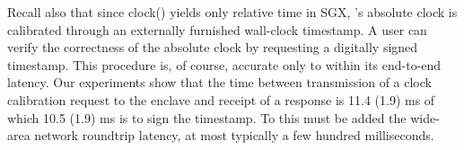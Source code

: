 Recall also that since clock() yields only relative time in SGX, \tc's absolute clock is calibrated through an externally furnished wall-clock timestamp.
A user can verify the correctness of the \encname absolute clock by requesting a digitally signed timestamp.
This procedure is, of course, accurate only to within its end-to-end latency. Our experiments show that the time between \medname transmission of a clock calibration request to the enclave and receipt of a response is
11.4 (1.9) ms of which 10.5 (1.9) ms is to 
sign the timestamp.
To this must be added the wide-area network roundtrip latency, at most typically a few hundred milliseconds. %
